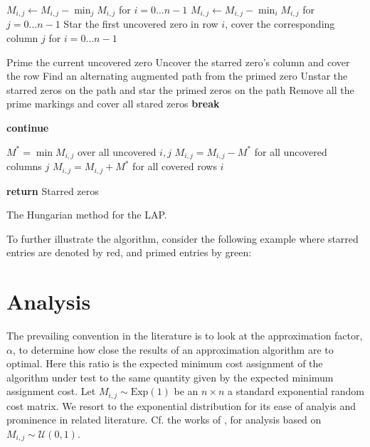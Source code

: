 \documentclass{article}
\newcommand{\exprv}[1]{\text{Exp} \left( #1 \right )}
\begin{document}
\begin{algorithm}
\begin{algorithmic}
 
\State $M_{i,j} \gets M_{i,j} - \min_j M_{i,j}$ for $ i = 0 \ldots n - 1$
\State $M_{i,j} \gets M_{i,j} - \min_i M_{i,j}$ for $ j = 0 \ldots n - 1$
\State Star the first uncovered zero in row $i$, cover the corresponding column $j$ for $ i = 0 \ldots n - 1$

		\State Prime the current uncovered zero
			\State Uncover the starred zero's column and cover the row
		\Else
			\State Find an alternating augmented path from the primed zero
			\State Unstar the starred zeros on the path and star the primed zeros on the path
			\State Remove all the prime markings and cover all stared zeros
			\State \textbf{break}
		\EndIf
	\EndWhile

		\State \textbf{continue}
	\EndIf

	\State $M^* = \min M_{i,j}$ over all uncovered $i, j$
	\State $M_{i,j} = M_{i,j} - M^*$ for all uncovered columns $j$
	\State $M_{i,j} = M_{i,j} + M^*$ for all covered rows $i$
\EndWhile

\State \textbf{return} Starred zeros 
\EndProcedure
\end{algorithmic}
\caption{The Hungarian method for the LAP.}
\label{alg:hungarian}
\end{algorithm}

To further illustrate the algorithm, consider the following example where starred entries are denoted by red, and primed entries by green:


\section{Analysis}

The prevailing convention in the literature is to look at the approximation factor, $\alpha$, to determine how close the results of an approximation algorithm are to optimal. Here this ratio is the expected minimum cost assignment of the algorithm under test to the same quantity given by the expected minimum assignment cost. Let $M_{i,j} \sim \exprv{1}$ be an $n \times n$ a standard exponential random cost matrix. We resort to the exponential distribution for its ease of analyis and prominence in related literature. Cf. the works of \cite{kurtzberg1962approximation}, \cite{michael1990probability} for analysis based on $M_{i,j} \sim \mathcal{U}(0,1)$.
\end{document}

